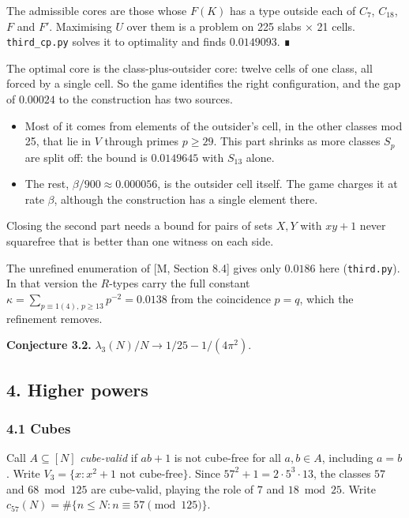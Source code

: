 \documentclass[
  11pt,
]{article}
\providecommand{\tightlist}{%
  \setlength{\itemsep}{0pt}\setlength{\parskip}{0pt}}
\begin{document}
The admissible cores are those whose \(F(K)\) has a type outside each of
\(C_7\), \(C_{18}\), \(F\) and \(F'\). Maximising \(U\) over them is a
problem on 225 slabs × 21 cells. \texttt{third\_cp.py} solves it to
optimality and finds \(0.0149093\). ∎

The optimal core is the class-plus-outsider core: twelve cells of one
class, all forced by a single cell. So the game identifies the right
configuration, and the gap of \(0.00024\) to the construction has two
sources.

\begin{itemize}
\tightlist
\item
  Most of it comes from elements of the outsider's cell, in the other
  classes mod 25, that lie in \(V\) through primes \(p \ge 29\). This
  part shrinks as more classes \(S_p\) are split off: the bound is
  \(0.0149645\) with \(S_{13}\) alone.
\item
  The rest, \(\beta/900 \approx 0.000056\), is the outsider cell itself.
  The game charges it at rate \(\beta\), although the construction has a
  single element there.
\end{itemize}

Closing the second part needs a bound for pairs of sets \(X, Y\) with
\(xy + 1\) never squarefree that is better than one witness on each
side.

The unrefined enumeration of {[}M, Section 8.4{]} gives only \(0.0186\)
here (\texttt{third.py}). In that version the \(R\)-types carry the full
constant \(\kappa = \sum_{p\equiv 1 (4),\, p\ge 13} p^{-2} = 0.0138\)
from the coincidence \(p = q\), which the refinement removes.

\textbf{Conjecture 3.2.} \(\lambda_3(N)/N \to 1/25 - 1/(4\pi^2)\).

\subsection{4. Higher powers}

\subsubsection{4.1 Cubes}

Call \(A \subseteq [N]\) \emph{cube-valid} if \(ab + 1\) is not
cube-free for all \(a, b \in A\), including \(a = b\). Write
\(V_3 = \{x : x^2 + 1 \text{ not cube-free}\}\). Since
\(57^2 + 1 = 2\cdot 5^{3}\cdot 13\), the classes \(57\) and
\(68 \bmod 125\) are cube-valid, playing the role of \(7\) and
\(18 \bmod 25\). Write
\(c_{57}(N) = \#\{n \le N : n \equiv 57 \pmod{125}\}\).
\end{document}
